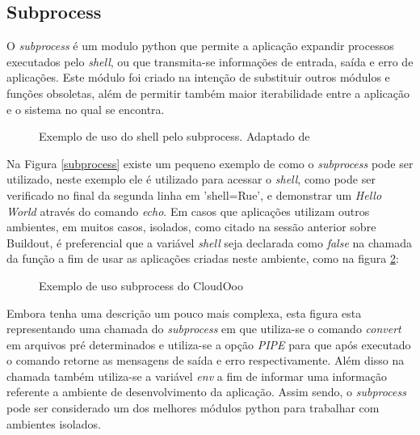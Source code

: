 \subsection{Subprocess}
O \textit{subprocess} é um modulo python que permite a aplicação expandir processos executados pelo \textit{shell}, ou que transmita-se informações de entrada, saída e erro de aplicações. Este módulo foi criado na intenção de substituir outros módulos e funções obsoletas, além de permitir também maior iterabilidade entre a aplicação e o sistema no qual se encontra.
\begin{figure}[ht]
    \centering
    \caption{Exemplo de uso do shell pelo subprocess. Adaptado de \cite{Gadner Subprocess}}
    \label{Subprocess}
\end{figure}
Na Figura \ref{subprocess} existe um pequeno exemplo de como o \textit{subprocess} pode ser utilizado, neste exemplo ele é utilizado para acessar o \textit{shell}, como pode ser verificado no final da segunda linha em 'shell=Rue',  e demonstrar um \textit{Hello World} através do comando \textit{echo}. 
Em casos que aplicações utilizam outros ambientes, em muitos casos, isolados, como citado na sessão anterior sobre Buildout, é preferencial que a variável \textit{shell} seja declarada como \textit{false} na chamada da função a fim de usar as aplicações criadas neste ambiente, como na figura \ref{subprocess_convert}:
\begin{figure}[ht]
    \centering
    \caption{Exemplo de uso subprocess do CloudOoo}
    \label{subprocess_convert}
\end{figure}
Embora tenha uma descrição um pouco mais complexa, esta figura esta representando uma chamada do \textit{subprocess} em que utiliza-se o comando \textit{convert} em arquivos pré determinados e utiliza-se a opção \textit{PIPE} para que após executado o comando retorne as mensagens de saída e erro respectivamente. Além disso na chamada também utiliza-se a variável \textit{env} a fim de informar uma informação referente a ambiente de desenvolvimento da aplicação.
Assim sendo, o \textit{subprocess}  pode ser considerado um dos melhores módulos python para trabalhar com ambientes isolados.

